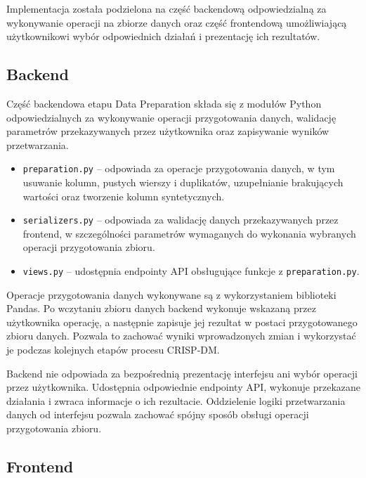 \documentclass[12pt]{book}
\begin{document}
Implementacja została podzielona na część backendową
odpowiedzialną za wykonywanie operacji na zbiorze danych oraz
część frontendową umożliwiającą użytkownikowi wybór odpowiednich
działań i prezentację ich rezultatów.

\subsection{Backend}

Część backendowa etapu Data Preparation składa się z modułów
Python odpowiedzialnych za wykonywanie operacji przygotowania
danych, walidację parametrów przekazywanych przez użytkownika
oraz zapisywanie wyników przetwarzania.

\begin{itemize}

	\item \texttt{preparation.py} -- odpowiada za operacje
	przygotowania danych, w tym usuwanie kolumn, pustych wierszy
	i duplikatów, uzupełnianie brakujących wartości oraz tworzenie
	kolumn syntetycznych.

	\item \texttt{serializers.py} -- odpowiada za walidację
	danych przekazywanych przez frontend, w szczególności
	parametrów wymaganych do wykonania wybranych operacji
	przygotowania zbioru.

	\item \texttt{views.py} -- udostępnia endpointy API
	obsługujące funkcje z \texttt{preparation.py}.

\end{itemize}

Operacje przygotowania danych wykonywane są z wykorzystaniem biblioteki Pandas.
Po wczytaniu zbioru danych backend wykonuje wskazaną przez użytkownika operację,
a następnie zapisuje jej rezultat w postaci przygotowanego zbioru danych.
Pozwala to zachować wyniki wprowadzonych zmian i wykorzystać je podczas
kolejnych etapów procesu CRISP-DM.

Backend nie odpowiada za bezpośrednią prezentację interfejsu ani wybór operacji
przez użytkownika. Udostępnia odpowiednie endpointy API, wykonuje przekazane działania
i zwraca informacje o ich rezultacie. Oddzielenie logiki przetwarzania danych
od interfejsu pozwala zachować spójny sposób obsługi operacji przygotowania zbioru.

\subsection{Frontend}
\end{document}
